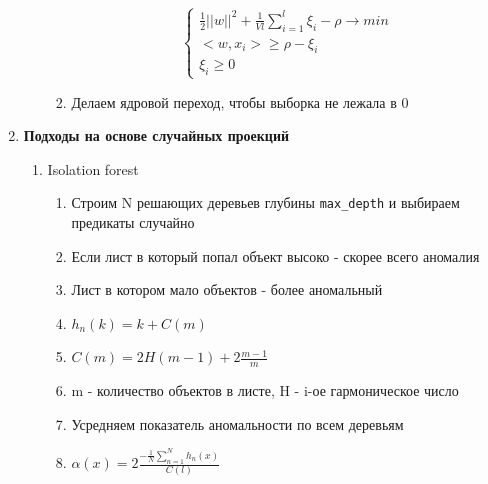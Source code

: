 \documentclass[a4paper, 12pt]{article}
\begin{document}
\begin{enumerate}
\begin{enumerate}
\begin{enumerate}
      \[\begin{cases}
          \frac{1}{2}||w||^2 + \frac{1}{Vl}\sum_{i = 1}^l \xi_i - \rho \rightarrow min \\
          <w, x_i> \geq \rho - \xi_i \\
          \xi_i \geq 0
      \end{cases}\]
      \item Делаем ядровой переход, чтобы выборка не лежала в 0
    \end{enumerate}
  \end{enumerate}
  \item \textbf{Подходы на основе случайных проекций}
  \begin{enumerate}
    \item Isolation forest
    \begin{enumerate}
      \item Строим N решающих деревьев глубины \verb+max_depth+ и выбираем предикаты случайно
      \item Если лист в который попал объект высоко - скорее всего аномалия
      \item Лист в котором мало объектов - более аномальный
      \item $h_n(k) = k + C(m)$
      \item $C(m) = 2H(m - 1) + 2\frac{m - 1}{m}$
      \item m - количество объектов в листе, H - i-ое гармоническое число
      \item Усредняем показатель аномальности по всем деревьям
      \item $\alpha(x) = 2\frac{-\frac{1}{N}\sum_{n = 1}^N h_n(x)}{C(l)}$
    \end{enumerate}
  \end{enumerate}
\end{enumerate} 
\end{document}
